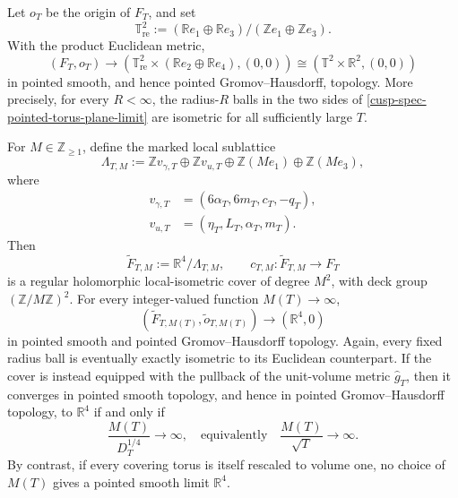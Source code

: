 \begin{theorem}
\label{cusp-spec-pointed-limits}
Let \(o_T\) be the origin of \(F_T\), and set
\begin{equation}
 \mathbb T^2_{\mathrm{re}}
 :=(\mathbb Re_1\oplus\mathbb Re_3)/
   (\mathbb Ze_1\oplus\mathbb Ze_3).
 \label{cusp-spec-real-two-torus}
\end{equation}
With the product Euclidean metric,
\begin{equation}
 (F_T,o_T)\longrightarrow
 (\mathbb T^2_{\mathrm{re}}\times
  (\mathbb Re_2\oplus\mathbb Re_4),(0,0))
 \cong(\mathbb T^2\times\mathbb R^2,(0,0))
 \label{cusp-spec-pointed-torus-plane-limit}
\end{equation}
in pointed smooth, and hence pointed Gromov--Hausdorff, topology.  More
precisely, for every \(R<\infty\), the radius-\(R\) balls in the two sides
of \cref{cusp-spec-pointed-torus-plane-limit} are isometric for all
sufficiently large \(T\).

For \(M\in\mathbb Z_{\ge1}\), define the marked local sublattice
\begin{equation}
 \Lambda_{T,M}:=
 \mathbb Zv_{\gamma,T}\oplus\mathbb Zv_{u,T}
 \oplus\mathbb Z(Me_1)\oplus\mathbb Z(Me_3),
 \label{cusp-spec-cover-sublattice}
\end{equation}
where
\begin{equation}
 \begin{aligned}
 v_{\gamma,T}&=(6\alpha_T,6m_T,c_T,-q_T),\\
 v_{u,T}&=(\eta_T,L_T,\alpha_T,m_T).
 \end{aligned}
 \label{cusp-spec-long-period-vectors}
\end{equation}
Then
\begin{equation}
 \widetilde F_{T,M}:=\mathbb R^4/\Lambda_{T,M},
 \qquad
 c_{T,M}:\widetilde F_{T,M}\longrightarrow F_T
 \label{cusp-spec-degree-cover}
\end{equation}
 is a regular holomorphic local-isometric cover of degree \(M^2\), with deck
 group \((\mathbb Z/M\mathbb Z)^2\).  For every integer-valued
function \(M(T)\to\infty\),
\begin{equation}
 (\widetilde F_{T,M(T)},\widetilde o_{T,M(T)})
 \longrightarrow(\mathbb R^4,0)
 \label{cusp-spec-cover-Euclidean-limit}
\end{equation}
in pointed smooth and pointed Gromov--Hausdorff topology.  Again, every fixed
radius ball is eventually exactly isometric to its Euclidean counterpart.
If the cover is instead equipped with the pullback of the unit-volume metric
\(\widehat g_T\), then it converges in pointed smooth topology, and hence in
pointed Gromov--Hausdorff topology, to \(\mathbb R^4\) if and only if
\begin{equation}
 \frac{M(T)}{D_T^{1/4}}\longrightarrow\infty,
 \quad\text{equivalently}\quad
 \frac{M(T)}{\sqrt T}\longrightarrow\infty.
 \label{cusp-spec-unit-volume-cover-condition}
\end{equation}
By contrast, if every covering torus is itself rescaled to volume one, no
choice of \(M(T)\) gives a pointed smooth limit \(\mathbb R^4\).
\end{theorem}

